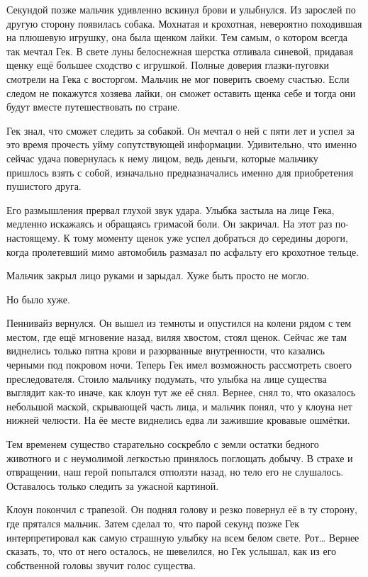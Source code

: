 \documentclass[
  a5paperpaper,
  DIV=11,
  numbers=noendperiod]{scrreprt}
\begin{document}
Секундой позже мальчик удивленно вскинул брови и улыбнулся. Из зарослей
по другую сторону появилась собака. Мохнатая и крохотная, невероятно
походившая на плюшевую игрушку, она была щенком лайки. Тем самым, о
котором всегда так мечтал Гек. В свете луны белоснежная шерстка отливала
синевой, придавая щенку ещё большее сходство с игрушкой. Полные доверия
глазки-пуговки смотрели на Гека с восторгом. Мальчик не мог поверить
своему счастью. Если следом не покажутся хозяева лайки, он сможет
оставить щенка себе и тогда они будут вместе путешествовать по стране.

Гек знал, что сможет следить за собакой. Он мечтал о ней с пяти лет и
успел за это время прочесть уйму сопутствующей информации. Удивительно,
что именно сейчас удача повернулась к нему лицом, ведь деньги, которые
мальчику пришлось взять с собой, изначально предназначались именно для
приобретения пушистого друга.

Его размышления прервал глухой звук удара. Улыбка застыла на лице Гека,
медленно искажаясь и обращаясь гримасой боли. Он закричал. На этот раз
по-настоящему. К тому моменту щенок уже успел добраться до середины
дороги, когда пролетевший мимо автомобиль размазал по асфальту его
крохотное тельце.

Мальчик закрыл лицо руками и зарыдал. Хуже быть просто не могло.

Но было хуже.

Пеннивайз вернулся. Он вышел из темноты и опустился на колени рядом с
тем местом, где ещё мгновение назад, виляя хвостом, стоял щенок. Сейчас
же там виднелись только пятна крови и разорванные внутренности, что
казались черными под покровом ночи. Теперь Гек имел возможность
рассмотреть своего преследователя. Стоило мальчику подумать, что улыбка
на лице существа выглядит как-то иначе, как клоун тут же её снял.
Вернее, снял то, что оказалось небольшой маской, скрывающей часть лица,
и мальчик понял, что у клоуна нет нижней челюсти. На ёе месте виднелись
едва ли зажившие кровавые ошмётки.

Тем временем существо старательно соскребло с земли остатки бедного
животного и с неумолимой легкостью принялось поглощать добычу. В страхе
и отвращении, наш герой попытался отползти назад, но тело его не
слушалось. Оставалось только следить за ужасной картиной.

Клоун покончил с трапезой. Он поднял голову и резко повернул её в ту
сторону, где прятался мальчик. Затем сделал то, что парой секунд позже
Гек интерпретировал как самую страшную улыбку на всем белом свете.
Рот\ldots{} Вернее сказать, то, что от него осталось, не шевелился, но
Гек услышал, как из его собственной головы звучит голос существа.
\end{document}
